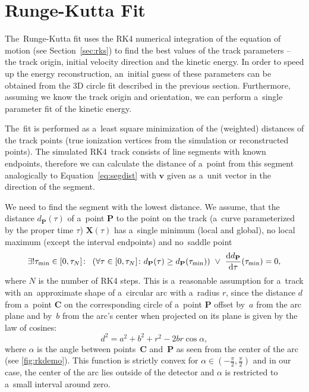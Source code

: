 	\section{Runge-Kutta Fit}
	\label{sec:rkfit}
		The~Runge-Kutta fit uses the \acf{RK4} numerical integration of the equation of motion (see Section~\ref{sec:rks}) to find the best values of the track parameters -- the track origin, initial velocity direction and the kinetic energy. In order to speed up the energy reconstruction, an~initial guess of these parameters can be obtained from the 3D circle fit described in the previous section. Furthermore, assuming we know the track origin and orientation, we can perform a~single parameter fit of the kinetic energy.
		
		The~fit is performed as a~least square minimization of the (weighted) distances of the track points (true ionization vertices from the simulation or reconstructed points). The simulated \ac{RK4}~track consists of line segments with known endpoints, therefore we can calculate the distance of a~point from this segment analogically to Equation~\ref{eq:segdist} with $\mathbf{v}$ given as a~unit vector in the direction of the segment.
		
		We need to find the segment with the lowest distance. We assume, that the distance $d_\mathbf{P}(\tau)$ of a~point $\mathbf{P}$ to the point on the track (a~curve parameterized by the proper time $\tau$) $\mathbf{X}(\tau)$ has a~single minimum (local and global), no local maximum (except the interval endpoints) and no~saddle point
			\begin{equation}
				\label{eq:rk_assum}
				\exists!\tau_\text{min}\in[0,\tau_N]\colon\ \left(\forall\tau\in[0,\tau_N]\colon  d_{\mathbf{P}}(\tau) \geq d_{\mathbf{P}}(\tau_\text{min})\right)\ \lor\ \dv{d_{\mathbf{P}}}{\tau}{(\tau_\text{min})} = 0,
			\end{equation}
		where $N$ is the number of \ac{RK4} steps. This is a~reasonable assumption for a~track with an~approximate shape of a~circular arc with a~radius $r$, since the distance $d$ from a~point $\mathbf{C}$ on the corresponding circle of a~point $\mathbf{P}$ offset by~$a$ from the arc plane and by~$b$ from the arc's center when projected on its plane is given by the law of cosines:
			\begin{equation}
				\label{eq:rkdemo}
				d^2 = a^2+b^2+r^2 - 2br\cos\alpha,
			\end{equation}
		where $\alpha$ is the angle between points~$\mathbf{C}$ and~$\mathbf{P}$ as seen from the center of the arc (see \cref{fig:rkdemo}). This function is strictly convex for $\alpha\in\left(-\frac{\pi}{2},\frac{\pi}{2}\right)$ and in our case, the center of the arc lies outside of the detector and $\alpha$ is restricted to a~small interval around zero.
		

